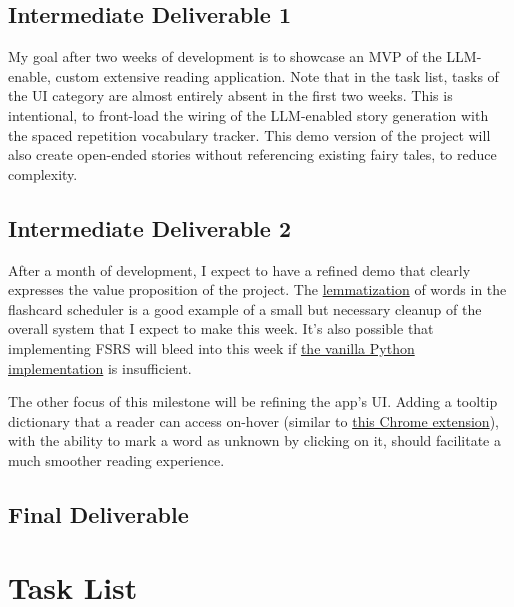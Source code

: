 \documentclass[
	letterpaper, %
]{jdf}
\begin{document}
\subsection{Intermediate Deliverable 1}
My goal after two weeks of development is to showcase an MVP of the LLM-enable, custom extensive reading application. Note that in the task list, tasks of the UI category are almost entirely absent in the first two weeks. This is intentional, to front-load the wiring of the LLM-enabled story generation with the spaced repetition vocabulary tracker. This demo version of the project will also create open-ended stories without referencing existing fairy tales, to reduce complexity.

\subsection{Intermediate Deliverable 2}
After a month of development, I expect to have a refined demo that clearly expresses the value proposition of the project. The \href{https://www.techtarget.com/searchenterpriseai/definition/lemmatization#:~:text=The%20goal%20of%20lemmatization%20is,and%20contextual%20analysis%20of%20words.}{lemmatization} of words in the flashcard scheduler is a good example of a small but necessary cleanup of the overall system that I expect to make this week. It's also possible that implementing FSRS will bleed into this week if \href{https://pypi.org/project/fsrs/}{the vanilla Python implementation} is insufficient. 

The other focus of this milestone will be refining the app's UI. Adding a tooltip dictionary that a reader can access on-hover (similar to \href{https://chromewebstore.google.com/detail/hover-lookup/ogjdcbnhgjgabidifpnpiidgbkhlpnof?pli=1}{this Chrome extension}), with the ability to mark a word as unknown by clicking on it, should facilitate a much smoother reading experience.

\subsection{Final Deliverable}



\section{Task List}
\end{document}
